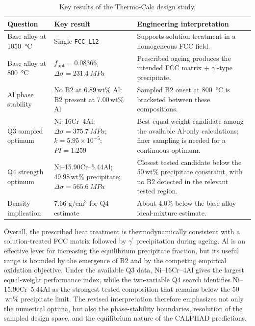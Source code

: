 \documentclass[11pt]{article}
\newcommand{\wtpct}{\ensuremath{\,\mathrm{wt}\%}}
\newcommand{\volfrac}{f_{\mathrm{ppt}}}
\newcommand{\gprime}{\ensuremath{\gamma^{\prime}}}
\newcommand{\phase}[1]{\texttt{#1}}
\begin{document}
\begin{table}[H]
\centering
\caption{Key results of the Thermo-Calc design study.}
\label{tab:keyresults}
\small
\begin{tabularx}{\textwidth}{@{}p{}p{}X@{}}
\toprule
\textbf{Question} & \textbf{Key result} & \textbf{Engineering interpretation} \\
\midrule
Base alloy at \SI{1050}{\degreeCelsius} & Single \phase{FCC\_L12} & Supports solution treatment in a homogeneous FCC field. \\
Base alloy at \SI{800}{\degreeCelsius} & $\volfrac=0.08366$, $\Delta\sigma=\SI{231.4}{MPa}$ & Prescribed ageing produces the intended FCC matrix + \gprime-type precipitate. \\
Al phase stability & No B2 at 6.89\wtpct{} Al; B2 present at 7.00\wtpct{} Al & Sampled B2 onset at \SI{800}{\degreeCelsius} is bracketed between these compositions. \\
Q3 sampled optimum & Ni--16Cr--4Al; $\Delta\sigma=\SI{375.7}{MPa}$; $k=5.95\times10^{-5}$; $PI=1.259$ & Best equal-weight candidate among the available Al-only calculations; finer sampling is needed for a continuous optimum. \\
Q4 strength optimum & Ni--15.90Cr--5.44Al; 49.98\wtpct{} precipitate; $\Delta\sigma=\SI{565.6}{MPa}$ & Closest tested candidate below the 50\wtpct{} precipitate constraint, with no B2 detected in the relevant tested region. \\
Density implication & 7.66 g/cm$^3$ for Q4 estimate & About 4.0\% below the base-alloy ideal-mixture estimate. \\
\bottomrule
\end{tabularx}
\end{table}

Overall, the prescribed heat treatment is thermodynamically consistent with a solution-treated FCC matrix followed by \gprime{} precipitation during ageing. Al is an effective lever for increasing the equilibrium precipitate fraction, but its useful range is bounded by the emergence of B2 and by the competing empirical oxidation objective. Under the available Q3 data, Ni--16Cr--4Al gives the largest equal-weight performance index, while the two-variable Q4 search identifies Ni--15.90Cr--5.44Al as the strongest tested composition that remains below the 50\wtpct{} precipitate limit. The revised interpretation therefore emphasizes not only the numerical optima, but also the phase-stability boundaries, resolution of the sampled design space, and the equilibrium nature of the CALPHAD predictions.
\end{document}
